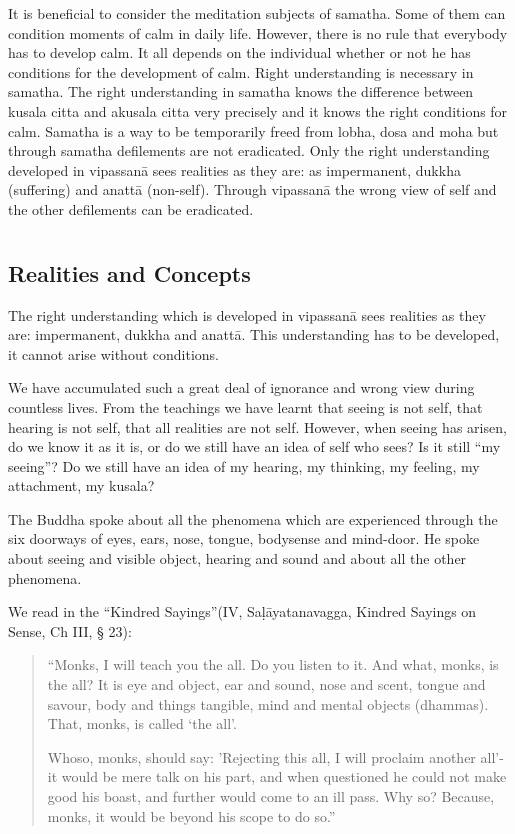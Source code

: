It is beneficial to consider the meditation subjects of samatha. Some of
them can condition moments of calm in daily life. However, there is no
rule that everybody has to develop calm. It all depends on the
individual whether or not he has conditions for the development of calm.
Right understanding is necessary in samatha. The right understanding in
samatha knows the difference between kusala citta and akusala citta very
precisely and it knows the right conditions for calm. Samatha is a way
to be temporarily freed from lobha, dosa and moha but through samatha
defilements are not eradicated. Only the right understanding developed
in vipassanā sees realities as they are: as impermanent, dukkha
(suffering) and anattā (non-self). Through vipassanā the wrong view of
self and the other defilements can be eradicated.



\chapter[Realities and Concepts]{}
\section*{Realities and Concepts}

The right understanding which is developed in vipassanā sees realities
as they are: impermanent, dukkha and anattā. This understanding has to
be developed, it cannot arise without conditions.

We have accumulated such a great deal of ignorance and wrong view during
countless lives. From the teachings we have learnt that seeing is not
self, that hearing is not self, that all realities are not self.
However, when seeing has arisen, do we know it as it is, or do we still
have an idea of self who sees? Is it still ``my seeing''? Do we still
have an idea of my hearing, my thinking, my feeling, my attachment, my
kusala?

The Buddha spoke about all the phenomena which are experienced through
the six doorways of eyes, ears, nose, tongue, bodysense and mind-door.
He spoke about seeing and visible object, hearing and sound and about
all the other phenomena.

We read in the ``Kindred Sayings''(IV, Saḷāyatanavagga, Kindred Sayings
on Sense, Ch III, § 23):

\begin{quote}

``Monks, I will teach you the all. Do you listen to it. And what, monks,
is the all? It is eye and object, ear and sound, nose and scent, tongue
and savour, body and things tangible, mind and mental objects (dhammas).
That, monks, is called `the all'.

Whoso, monks, should say: 'Rejecting this all, I will proclaim another
all'- it would be mere talk on his part, and when questioned he could
not make good his boast, and further would come to an ill pass. Why so?
Because, monks, it would be beyond his scope to do so.''

\end{quote}

